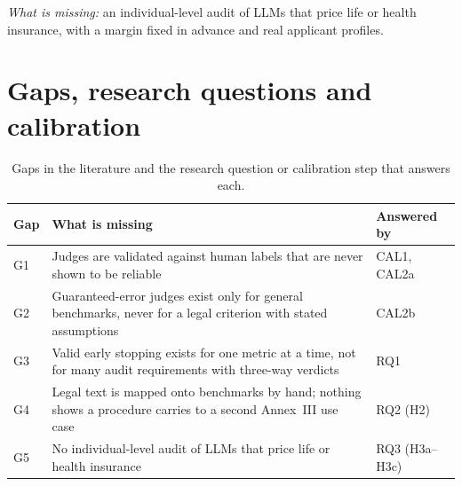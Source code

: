 \emph{What is missing:} an individual-level audit of LLMs that price life or health insurance, with a margin fixed in advance and real applicant profiles.

\section{Gaps, research questions and calibration}
\begin{table}[H]
\centering
\caption{Gaps in the literature and the research question or calibration step that answers each.}
\label{tab:gaps}
\small
\begin{tabularx}{\textwidth}{@{}lXl@{}}
\toprule
Gap & What is missing & Answered by \\
\midrule
G1 & Judges are validated against human labels that are never shown to be reliable & CAL1, CAL2a \\
G2 & Guaranteed-error judges exist only for general benchmarks, never for a legal criterion with stated assumptions & CAL2b \\
G3 & Valid early stopping exists for one metric at a time, not for many audit requirements with three-way verdicts & RQ1 \\
G4 & Legal text is mapped onto benchmarks by hand; nothing shows a procedure carries to a second Annex~III use case & RQ2 (H2) \\
G5 & No individual-level audit of LLMs that price life or health insurance & RQ3 (H3a--H3c) \\
\bottomrule
\end{tabularx}
\end{table}


